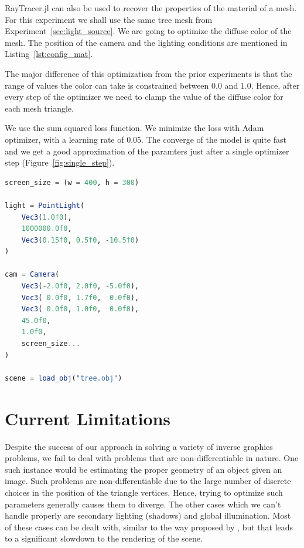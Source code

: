 \documentclass{juliacon}
\begin{document}
RayTracer.jl can also be used to recover the properties of the material of a mesh. For this experiment we shall use the same tree mesh from Experiment~\ref{sec:light_source}. We are going to optimize the diffuse color of the mesh. The position of the camera and the lighting conditions are mentioned in Listing~\ref{lst:config_mat}.

The major difference of this optimization from the prior experiments is that the range of values the color can take is constrained between $0.0$ and $1.0$. Hence, after every step of the optimizer we need to clamp the value of the diffuse color for each mesh triangle.

We use the sum squared loss function. We minimize the loss with Adam optimizer, with a learning rate of 0.05. The converge of the model is quite fast and we get a good approximation of the paramters just after a single optimizer step (Figure~\ref{fig:single_step}).

\noindent
\begin{minipage}{\linewidth}
\begin{lstlisting}[caption = {Configuration of the Scene for Experiment~\ref{sec:mat_color}},
                   label = {lst:config_mat},
                   captionpos = b,
                   language = Julia]
screen_size = (w = 400, h = 300)

light = PointLight(
    Vec3(1.0f0),
    1000000.0f0,
    Vec3(0.15f0, 0.5f0, -10.5f0)
)

cam = Camera(
    Vec3(-2.0f0, 2.0f0, -5.0f0),
    Vec3( 0.0f0, 1.7f0,  0.0f0),
    Vec3( 0.0f0, 1.0f0,  0.0f0),
    45.0f0,
    1.0f0,
    screen_size...
)

scene = load_obj("tree.obj")
\end{lstlisting}
\end{minipage}


\section{Current Limitations}

Despite the success of our approach in solving a variety of inverse graphics problems, we fail to deal with problems that are non-differentiable in nature. One such instance would be estimating the proper geometry of an object given an image. Such problems are non-differentiable due to the large number of discrete choices in the position of the triangle vertices. Hence, trying to optimize such parameters generally causes them to diverge. The other cases which we can't handle properly are secondary lighting (shadows) and global illumination. Most of these cases can be dealt with, similar to the way proposed by \cite{Li:2018:DMC}, but that leads to a significant slowdown to the rendering of the scene. 
\end{document}
